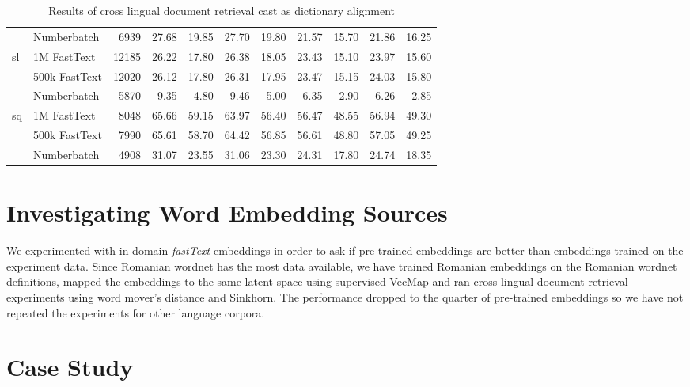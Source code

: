 \begin{landscape}
\begin{table}[htbp]
\begin{tabular}{llrrrrrrrrr}
 & Numberbatch & 6939 & 27.68 & 19.85 & 27.70 & 19.80 & 21.57 & 15.70 & 21.86 & 16.25 \\ \cmidrule(lr){2-11}
\multirow{3}{*}{sl} & 1M FastText & 12185 & 26.22 & 17.80 & 26.38 & 18.05 & 23.43 & 15.10 & 23.97 & 15.60 \\
 & 500k FastText & 12020 & 26.12 & 17.80 & 26.31 & 17.95 & 23.47 & 15.15 & 24.03 & 15.80 \\
 & Numberbatch & 5870 & 9.35 & 4.80 & 9.46 & 5.00 & 6.35 & 2.90 & 6.26 & 2.85 \\ \cmidrule(lr){2-11}
\multirow{3}{*}{sq} & 1M FastText & 8048 & 65.66 & 59.15 & 63.97 & 56.40 & 56.47 & 48.55 & 56.94 & 49.30 \\
 & 500k FastText & 7990 & 65.61 & 58.70 & 64.42 & 56.85 & 56.61 & 48.80 & 57.05 & 49.25 \\
 & Numberbatch & 4908 & 31.07 & 23.55 & 31.06 & 23.30 & 24.31 & 17.80 & 24.74 & 18.35 \\
 \bottomrule
\end{tabular}
\caption{Results of cross lingual document retrieval cast as dictionary alignment}%
\label{tab:cldr_results}
\end{table}
\end{landscape}

\section{Investigating Word Embedding Sources}%
\label{sec:investigating_word_embedding_sources}

We experimented with in domain \emph{fastText} embeddings in order to ask if pre-trained embeddings are better than embeddings trained on the experiment data.
Since Romanian wordnet has the most data available, we have trained Romanian embeddings on the Romanian wordnet definitions, mapped the embeddings to the same latent space using supervised VecMap and ran cross lingual document retrieval experiments using word mover's distance and Sinkhorn.
The performance dropped to the quarter of pre-trained embeddings so we have not repeated the experiments for other language corpora.


\section{Case Study}%
\label{sec:case_study}


